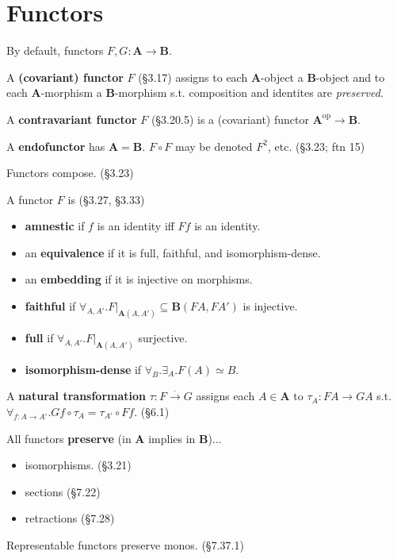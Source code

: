 \documentclass[10pt,twocolumn,letterpaper]{article}
\newcommand{\natto}{\overset{\cdot}{\to}}
\newcommand{\defn}[1]{{\bf #1}}
\begin{document}
\section{Functors}

  By default, functors $F,G : \mathbf{A} \to \mathbf{B}$.

  A \defn{(covariant) functor} $F$ (\S3.17) assigns to each
  $\mathbf{A}$-object a $\mathbf{B}$-object and to each
  $\mathbf{A}$-morphism a $\mathbf{B}$-morphism s.t. composition and
  identites are {\em preserved}.

  A \defn{contravariant functor} $F$ (\S3.20.5) is a (covariant) functor
  $\mathbf{A}^\text{op} \to \mathbf{B}$.

  A \defn{endofunctor} has $\mathbf{A} = \mathbf{B}$.  $F \circ F$ may be
  denoted $F^2$, etc. (\S3.23; ftn 15)

  Functors compose. (\S3.23)

  A functor $F$ is (\S3.27, \S3.33)
  \begin{itemize}
    \item \defn{amnestic} if $f$ is an identity iff $Ff$ is an identity.
    \item an \defn{equivalence} if it is full, faithful, and
      isomorphism-dense.
    \item an \defn{embedding} if it is injective on morphisms.
    \item \defn{faithful} if $\forall_{A,A'} . F\vert_{\mathbf{A}(A,A')}
      \subseteq \mathbf{B}(FA, FA')$ is injective.
    \item \defn{full} if $\forall_{A,A'} . F\vert_{\mathbf{A}(A,A')}$ surjective.
    \item \defn{isomorphism-dense} if $\forall_B . \exists_A . F(A) \simeq B$.
  \end{itemize}

  A \defn{natural transformation} $\tau : F \natto G$ assigns each
  $A \in \mathbf{A}$ to $\tau_A : FA \to GA$ s.t.
  $\forall_{f : A \to A'} . G f \circ \tau_A = \tau_{A'} \circ F f$. (\S6.1)

  All functors \defn{preserve} (in $\mathbf{A}$ implies in $\mathbf{B}$)$\dots$
    \begin{itemize}
      \item isomorphisms. (\S3.21)
      \item sections (\S7.22)
      \item retractions (\S7.28)
    \end{itemize}

  Representable functors preserve monos. (\S7.37.1)
\end{document}
